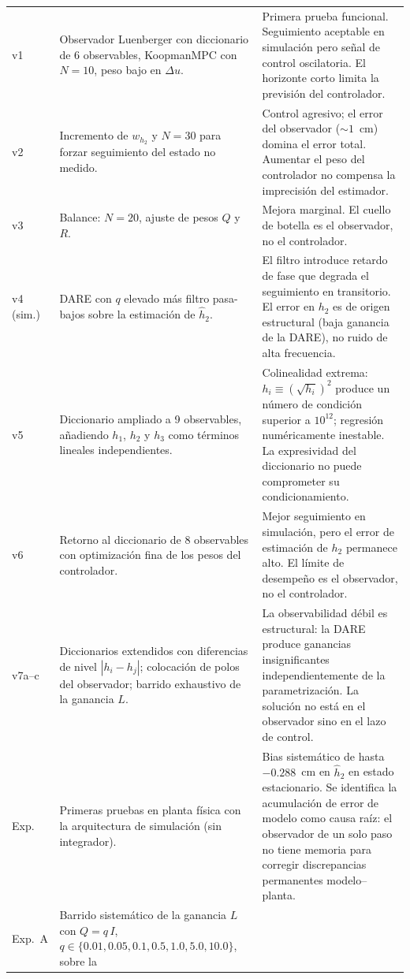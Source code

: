 \documentclass[12pt,letterpaper]{article}
\begin{document}
\begin{longtable}{p{1.8cm} p{7.0cm} p{6.5cm}}
v1 & Observador Luenberger con diccionario de 6 observables,
KoopmanMPC con $N=10$, peso bajo en $\Delta u$. &
Primera prueba funcional. Seguimiento aceptable en simulación
pero señal de control oscilatoria. El horizonte corto limita la
previsión del controlador. \\
v2 & Incremento de $w_{h_2}$ y $N=30$ para forzar seguimiento
del estado no medido. &
Control agresivo; el error del observador ($\sim 1$~cm) domina
el error total. Aumentar el peso del controlador no compensa
la imprecisión del estimador. \\
v3 & Balance: $N=20$, ajuste de pesos $Q$ y $R$. &
Mejora marginal. El cuello de botella es el observador,
no el controlador. \\
v4 (sim.) & DARE con $q$ elevado más filtro pasa-bajos sobre
la estimación de $\hat{h}_2$. &
El filtro introduce retardo de fase que degrada el seguimiento
en transitorio. El error en $h_2$ es de origen estructural
(baja ganancia de la DARE), no ruido de alta frecuencia. \\
v5 & Diccionario ampliado a 9 observables, añadiendo $h_1$,
$h_2$ y $h_3$ como términos lineales independientes. &
Colinealidad extrema: $h_i \equiv (\sqrt{h_i})^2$ produce un
número de condición superior a $10^{12}$; regresión numéricamente
inestable. La expresividad del diccionario no puede comprometer
su condicionamiento. \\
v6 & Retorno al diccionario de 8 observables con optimización
fina de los pesos del controlador. &
Mejor seguimiento en simulación, pero el error de estimación
de $h_2$ permanece alto. El límite de desempeño es el observador,
no el controlador. \\
v7a--c & Diccionarios extendidos con diferencias de nivel
$|h_i - h_j|$; colocación de polos del observador; barrido
exhaustivo de la ganancia $L$. &
La observabilidad débil es estructural: la DARE produce ganancias
insignificantes independientemente de la parametrización.
La solución no está en el observador sino en el lazo de control. \\
\midrule
Exp. & Primeras pruebas en planta física con la arquitectura
de simulación (sin integrador). &
Bias sistemático de hasta $-0.288$~cm en $\hat{h}_2$ en estado
estacionario. Se identifica la acumulación de error de modelo
como causa raíz: el observador de un solo paso no tiene memoria
para corregir discrepancias permanentes modelo--planta. \\
Exp.~A & Barrido sistemático de la ganancia $L$ con $Q = q\,I$,
$q \in \{0.01, 0.05, 0.1, 0.5, 1.0, 5.0, 10.0\}$, sobre la

\end{longtable}
\end{document}
